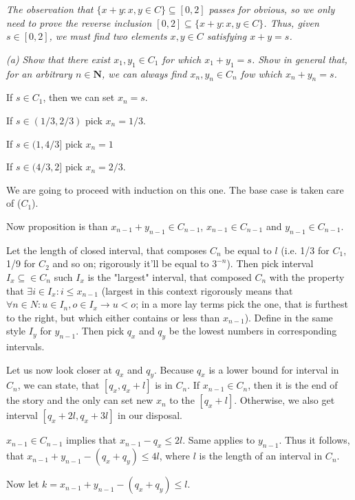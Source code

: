 \documentclass[11pt,oneside,titlepage]{book}
\begin{document}
\textit{The observation that $\{x + y: x,y \in C\} \subseteq [0,2]$ passes
  for obvious, so we only need to prove the reverse inclusion
  $[0, 2] \subseteq \{x + y: x,y \in C\}$. Thus, given $s \in [0,2]$, we
  must find two elements $x,y \in C$ satisfying $x + y = s$.}

\textit{(a) Show that there exist $x_1,y_1 \in C_1$ for which
  $x_1 + y_1 = s$. Show in general that, for an arbitrary $n \in \textbf{N}$,
  we  can always find $x_n,y_n \in C_n$ fow which $x_n + y_n = s$.
}

If $s \in C_1$, then we can set $x_n = s$.

If $s \in (1/3, 2/3)$ pick $x_n = 1/3$.

If $s \in (1, 4/3]$ pick $x_n = 1$

If $s \in (4/3,2]$ pick $x_n = 2/3$.

We are going to proceed with induction on this one. The base case is taken
care of ($C_1$).

Now proposition is than $x_{n - 1} + y_{n - 1} \in C_{n - 1}$,
$x_{n - 1} \in C_{n - 1}$ and $y_{n - 1} \in C_{n - 1}$.

Let the length of closed interval, that composes $C_n$ be equal to $l$
(i.e. 1/3 for $C_1$, 1/9 for $C_2$ and so on; rigorously it'll be equal
to $3^{-n}$). 
Then pick interval  $I_x \subseteq \in C_n$ 
such  $I_x$ is the "largest"
interval, that composed $C_n$ with the property that
$\exists i \in I_x: i \leq x_{n - 1}$ (largest
in this context rigorously means that
$\forall n \in N: u \in I_n, o \in I_x \to u < o$; in a more lay terms
pick the one, that is furthest to the right, but which either contains or
less than $x_{n - 1}$). Define in  the same style $I_y$ for $y_{n - 1}$.
Then pick $q_x$ and $q_y$ be the lowest numbers in corresponding intervals.

Let us now look closer at $q_x$ and $q_y$. Because $q_x$ is a lower bound
for interval in $C_n$,
we can state, that $[q_x,q_x + l]$ is in $C_n$. If $x_{n - 1} \in C_n$, then it
is the end of the story and the only can set new $x_n$ to the $[q_x + l]$.
Otherwise, we also get interval $[q_x + 2l, q_x + 3l]$ in our disposal.


$x_{n - 1} \in C_{n - 1}$  implies that $x_{n - 1} - q_x \leq 2l$.
Same applies to $y_{n - 1}$. 
Thus it follows, that $x_{n - 1} + y_{n - 1} - (q_x + q_y) \leq 4l$,
where $l$ is the length of an interval in $C_n$.

Now let $k = x_{n - 1} + y_{n - 1} - (q_x + q_y) \leq l$.
\end{document}
